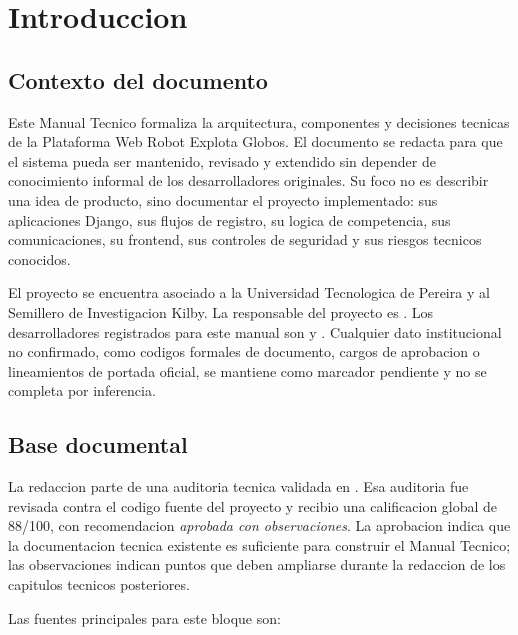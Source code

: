 \chapter{Introduccion}
\label{chap:introduccion}

\section{Contexto del documento}
\label{sec:introduccion-contexto}

Este Manual Tecnico formaliza la arquitectura, componentes y decisiones tecnicas de la Plataforma Web Robot Explota Globos. El documento se redacta para que el sistema pueda ser mantenido, revisado y extendido sin depender de conocimiento informal de los desarrolladores originales. Su foco no es describir una idea de producto, sino documentar el proyecto implementado: sus aplicaciones Django, sus flujos de registro, su logica de competencia, sus comunicaciones, su frontend, sus controles de seguridad y sus riesgos tecnicos conocidos.

El proyecto se encuentra asociado a la Universidad Tecnologica de Pereira y al Semillero de Investigacion Kilby. La responsable del proyecto es \ResponsableProyecto. Los desarrolladores registrados para este manual son \DesarrolladorUno{} y \DesarrolladorDos. Cualquier dato institucional no confirmado, como codigos formales de documento, cargos de aprobacion o lineamientos de portada oficial, se mantiene como marcador pendiente y no se completa por inferencia.

\section{Base documental}
\label{sec:introduccion-base-documental}

La redaccion parte de una auditoria tecnica validada en . Esa auditoria fue revisada contra el codigo fuente del proyecto y recibio una calificacion global de 88/100, con recomendacion \textit{aprobada con observaciones}. La aprobacion indica que la documentacion tecnica existente es suficiente para construir el Manual Tecnico; las observaciones indican puntos que deben ampliarse durante la redaccion de los capitulos tecnicos posteriores.

Las fuentes principales para este bloque son:

